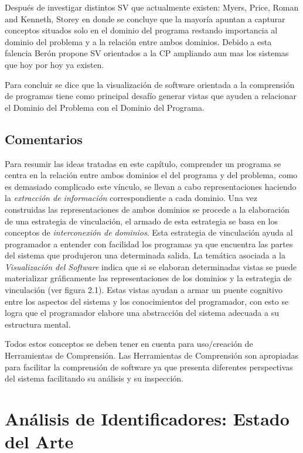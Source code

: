 \documentclass[12pt]{report}
\begin{document}
Después de investigar distintos SV que actualmente existen: Myers, Price, Roman and Kenneth, Storey \cite{MBPHRU10}
en donde se concluye que la mayoría apuntan a capturar conceptos situados solo en el dominio del programa restando importancia al dominio del problema y a la relación entre ambos dominios. Debido a esta falencia Berón \cite{MBPHRU10} propone SV orientados a la CP ampliando aun mas los sistemas que hoy por hoy ya existen.

Para concluir se dice que la visualización de software orientada a la comprensión de programas tiene como principal desafío generar vistas que ayuden a relacionar el Dominio del Problema con el Dominio del Programa. 

\section{Comentarios}

Para resumir las ideas tratadas en este capítulo, comprender un programa se centra en la relación entre ambos dominios el del programa y del problema, como es demasiado complicado este vínculo, se llevan a cabo representaciones haciendo la \textit{extracción de información} correspondiente a cada dominio. Una vez construidas las representaciones de ambos dominios se procede a la elaboración de una estrategia de vinculación, el armado de esta estrategia se basa en los conceptos de \textit{interconexión de dominios}. Esta estrategia de vinculación ayuda al programador a entender con facilidad los programas ya que encuentra las partes del sistema que produjeron una determinada salida. La temática asociada a la \textit{Visualización del Software} indica que si se elaboran determinadas vistas se puede materializar gráficamente las representaciones de los dominios y la estrategia de vinculación (ver figura 2.1). Estas vistas ayudan a armar un puente cognitivo entre los aspectos del sistema y los conocimientos del programador, con esto se logra que el programador elabore una abstracción del sistema adecuada a su estructura mental.

Todos estos conceptos se deben tener en cuenta para uso/creación de Herramientas de Comprensión.
Las Herramientas de Comprensión son apropiadas para facilitar la comprensión de software ya que presenta diferentes perspectivas del sistema facilitando su análisis y su inspección.




\chapter{Análisis de Identificadores: Estado del Arte}
\end{document}
